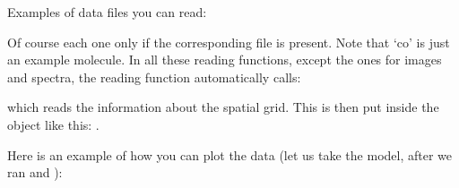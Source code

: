 \documentclass[letterpaper,10pt,english]{sphinxmanual}
\begin{document}
\begin{sphinxVerbatim}[commandchars=\\\{\}]
   
\end{sphinxVerbatim}

Examples of data files you can read:

\begin{sphinxVerbatim}[commandchars=\\\{\}]
  
  
  
  
  
  
  
  
  
\end{sphinxVerbatim}

Of course each one only if the corresponding file is present. Note that ‘co’ is
just an example molecule. In all these reading functions, except the ones for
images and spectra, the reading function automatically calls:

\begin{sphinxVerbatim}[commandchars=\\\{\}]
  
\end{sphinxVerbatim}

which reads the information about the spatial grid. This is then put inside the
 object like this: .

Here is an example of how you can plot the data (let us take the
 model, after we ran 
and ):
\end{document}
